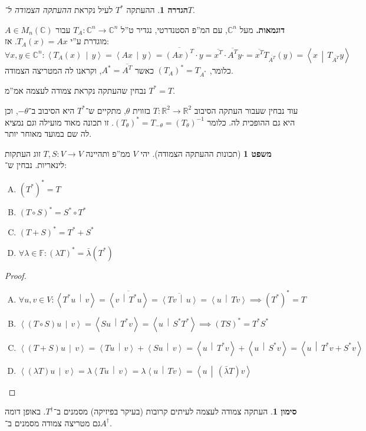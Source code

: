 \documentclass[a4paper]{article}
\newcommand\envendproof{\vspace{-16pt}}
\newcommand\R     {\mathbb{R}}
\newcommand\C     {\mathbb{C}}
\newcommand\ra    {\rangle}
\newcommand\la    {\langle}
\newcommand\ol    {\overline}
\newcommand\F         {\mathbb{F}}
\newcommand\co        {\colon}
\newcommand\mut [2]   {\left \la #1 \,\middle|\, #2 \right \ra}
\newcommand\tg        {\theta}
\renewcommand\lg      {\lambda}
\newcommand\op    {^{-1}}
\theoremstyle{definition}
\newtheorem{Theorem}{\color{myblue}משפט}
\newtheorem{Definition}{\color{mygreen}הגדרה}
\newtheorem{Notion}{\color{myred}סימון}
\newcommand\defi  [1] {\begin{Definition}#1\end{Definition}}
\newcommand\noti  [1] {\begin{Notion}#1\end{Notion}}
\begin{document}
	\defi{ההעתקה $T^*$ לעיל נקראת \textit{ההעתקה הצמודה ל־$T$}. }
	
	\textbf{דוגמאות. }
	מעל $\C^n$, עם המ''פ הסטנדרטי, נגדיר ט''ל $T_A \co \C^n \to \C^n$ עבור $A \in M_n(\C)$ מוגדרת ע''י $T_A(x) = Ax$. אז: 
	\[ \forall x, y \in \C^n \co \mut{T_A(x)}{y} = \mut{Ax}{y} = \ol{(Ax)^T} \cdot y = \ol{x^T}\cdot\ol{A^T}y\cdot = \ol{x^T}T_{\ol{A^T}}(y) = \mut{x}{T_{\ol{A^T}}y} \]
	כלומר, $(T_A)^* = T_{A^*}$ כאשר $A^* = \ol{A^T}$, וקראנו לה המטריצה הצמודה. 
	
	נבחין שהעתקה נקראת צמודה לעצמה אמ''מ $T^* = T$. 
	
	עוד נבחין שעבור העתקה הסיבוב $T \co \R^2 \to \R^2$ בזווית $\tg$, מתקיים ש־$T^*$ היא הסיבוב ב־$-\tg$, וכן היא גם ההופכית לה. כלומר $(T_{\tg})^* = T_{-\tg} = (T_\tg)\op$. זו תכונה מאוד מועילה וגם נמציא לה שם במועד מאוחר יותר. 
	
	\begin{Theorem}[תכונות ההעתקה הצמודה]
		יהי $V$ ממ''פ ותהיינה $T, S \co V \to V$ זוג העתקות לינאריות. נבחין ש־: 
		\begin{enumerate}[(A)]
			\item \hfil $(T^*)^* = T$
			\item \hfil $(T \circ S)^* = S^* \circ T^*$
			\item \hfil $(T + S)^* = T^* + S^*$
			\item \hfil $\forall \lg \in \F \co (\lg T)^* = \bar \lg (T^*)$
		\end{enumerate}
	\end{Theorem}
	
	\begin{proof}\,
		\begin{enumerate}[A)]
			\item \hfil $\forall u, v \in V \co \mut{T^* u}{v} = \ol{\mut{v}{T^* u}}  = \ol{\mut{Tv}{u}}  = \mut{u}{Tv} \implies (T^*)^* = T$
			\item \hfil $\mut{(T \circ S) u}{v} = \mut{Su}{T^*v} = \mut{u}{S^* T^*} \implies (TS)^* = T^*S^*$
			\item \hfil $\mut{(T + S)u}{v} = \mut{Tu}{v} + \mut{Su}{v} = \mut{u}{T^*v} + \mut{u}{S^*v}  = \mut{u}{T^*v + S^*v}$
			\item \hfil $\mut{(\lg T)u}{v} = \lg\mut{Tu}{v} = \lg \mut{u}{Tv} = \mut{u}{(\bar \lg T)v}$
		\end{enumerate}
		\envendproof
	\end{proof}
	
	\noti{העתקה צמודה לעצמה לעיתים קרובות (בעיקר בפיזיקה) מסמנים ב־$T^{\dag}$. באופן דומה גם מטריצה צמודה מסמנים ב־$A^{\dag}$. }
	
\end{document}

